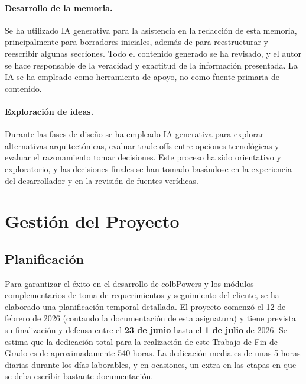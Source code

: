 \documentclass[11pt, letterpaper]{article}
\begin{document}
\paragraph{Desarrollo de la memoria.}
Se ha utilizado IA generativa para la asistencia en la redacción de esta memoria, principalmente para borradores iniciales, además de para reestructurar y reescribir algunas secciones. Todo el contenido generado se ha revisado, y el autor se hace responsable de la veracidad y exactitud de la información presentada. La IA se ha empleado como herramienta de apoyo, no como fuente primaria de contenido.

\paragraph{Exploración de ideas.}
Durante las fases de diseño se ha empleado IA generativa para explorar alternativas arquitectónicas, evaluar trade-offs entre opciones tecnológicas y evaluar el razonamiento tomar decisiones. Este proceso ha sido orientativo y exploratorio, y las decisiones finales se han tomado basándose en la experiencia del desarrollador y en la revisión de fuentes verídicas.

\newpage

\section{Gestión del Proyecto}
\label{sec:gestion_proyecto}

\subsection{Planificación}
\label{sec:descripcion_tareas}
Para garantizar el éxito en el desarrollo de colbPowers y los módulos complementarios de toma de requerimientos y seguimiento del cliente, se ha elaborado una planificación temporal detallada. El proyecto comenzó el 12 de febrero de 2026 (contando la documentación de esta asignatura) y tiene prevista su finalización y defensa entre el \textbf{23 de junio} hasta el \textbf{1 de julio} de 2026. Se estima que la dedicación total para la realización de este Trabajo de Fin de Grado es de aproximadamente 540 horas. La dedicación media es de unas 5 horas diarias durante los días laborables, y en ocasiones, un extra en las etapas en que se deba escribir bastante documentación.
\end{document}
